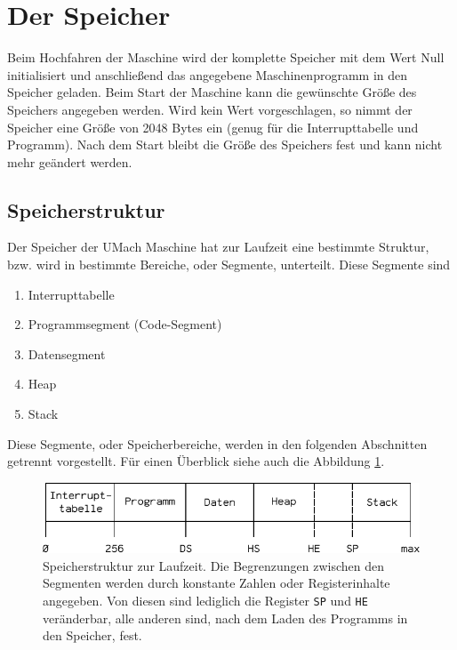 \section{Der Speicher}
\label{sec:Speicher}

Beim Hochfahren der Maschine wird der komplette Speicher mit dem Wert Null
initialisiert und anschließend das angegebene Maschinenprogramm in den Speicher
geladen. Beim Start der Maschine kann die gewünschte Größe des Speichers
angegeben werden. Wird kein Wert vorgeschlagen, so nimmt der Speicher eine Größe
von 2048 Bytes ein (genug für die Interrupttabelle und Programm). Nach dem Start
bleibt die Größe des Speichers fest und kann nicht mehr geändert werden.


\subsection{Speicherstruktur}
\label{subsec:Speicherstruktur}

Der Speicher der UMach Maschine hat zur Laufzeit eine bestimmte Struktur, bzw.
wird in bestimmte Bereiche, oder Segmente, unterteilt. Diese
Segmente sind
\begin{enumerate}
 \item Interrupttabelle
 \item Programmsegment (Code-Segment)
 \item Datensegment
 \item Heap
 \item Stack
\end{enumerate}

Diese Segmente, oder Speicherbereiche, werden in den folgenden Abschnitten
getrennt vorgestellt. Für einen Überblick siehe auch die Abbildung
\ref{fig:Speicherstruktur}.

\begin{figure}[htp]
 \centering
 \includegraphics{./img/UMach-Speicherstruktur}
 \caption[Speicherstruktur]
         {Speicherstruktur zur Laufzeit. Die Begrenzungen zwischen den
          Segmenten werden durch konstante Zahlen oder Registerinhalte
          angegeben. Von diesen sind lediglich die Register \texttt{SP}
          und \texttt{HE} veränderbar, alle anderen sind, nach dem Laden des
          Programms in den Speicher, fest.}
 \label{fig:Speicherstruktur}
\end{figure}



